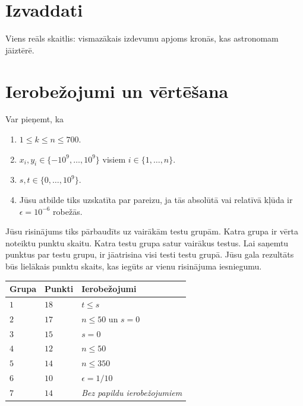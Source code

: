 \section*{Izvaddati}

Viens reāls skaitlis: vismazākais izdevumu apjoms kronās, kas astronomam jāiztērē.

\section*{Ierobežojumi un vērtēšana}

Var pieņemt, ka
\begin{enumerate}
\item $1\leq k\leq n\leq 700$. %
\item $x_i, y_i\in \{-10^9,\ldots, 10^9\}$ visiem $i\in\{1,\ldots,n\}$. %
\item $s,t\in \{0,\ldots, 10^9\}$. %
\item Jūsu atbilde tiks uzskatīta par pareizu, ja tās absolūtā vai relatīvā kļūda ir $\epsilon = 10^{-6}$ robežās.
\end{enumerate}

Jūsu risinājums tiks pārbaudīts uz vairākām testu grupām. Katra grupa ir vērta noteiktu punktu skaitu.
Katra testu grupa satur vairākus testus.
Lai saņemtu punktus par testu grupu, ir jāatrisina visi testi testu grupā.
Jūsu gala rezultāts būs lielākais punktu skaits, kas iegūts ar vienu risinājuma iesniegumu.

\medskip
\noindent
\begin{tabular}{lll}
  Grupa & Punkti & Ierobežojumi\\\hline
  $1$ & $18$ &  $t\leq s$\\
  $2$ & $17$ & $n\le 50$ un $s=0$\\
  $3$ & $15$ & $s=0$\\
  $4$ & $12$ & $n\leq 50$\\
  $5$ & $14$ & $n\leq 350$\\
  $6$ & $10$ & $\epsilon = 1/10$\\
  $7$ & $14$ & \emph{Bez papildu ierobežojumiem}\\
\end{tabular}
